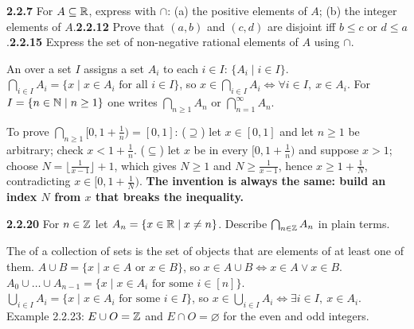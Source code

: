 \begin{trybox}[{2.2.7, 2.2.12, 2.2.15 \fO}]
\textbf{2.2.7} For $A\subseteq\mathbb{R}$, express with $\cap$: (a) the positive elements of $A$; (b) the integer elements of $A$.\quad \textbf{2.2.12} Prove that $(a,b)$ and $(c,d)$ are disjoint iff $b\le c$ or $d\le a$.\quad \textbf{2.2.15} Express the set of non-negative rational elements of $A$ using $\cap$.
\end{trybox}

\begin{key}
An  over a set $I$ assigns a set $A_i$ to each $i\in I$: $\{A_i\mid i\in I\}$. $\displaystyle\bigcap_{i\in I}A_i=\{x\mid x\in A_i\text{ for all }i\in I\}$, so $x\in\bigcap_{i\in I}A_i\Leftrightarrow\forall i\in I,\ x\in A_i$. For $I=\{n\in\mathbb{N}\mid n\ge1\}$ one writes $\bigcap_{n\ge1}A_n$ or $\bigcap_{n=1}^\infty A_n$.
\end{key}
\begin{strategy}
To prove $\bigcap_{n\ge1}[0,1+\frac1n)=[0,1]$: ($\supseteq$) let $x\in[0,1]$ and let $n\ge1$ be arbitrary; check $x<1+\frac1n$. ($\subseteq$) let $x$ be in every $[0,1+\frac1n)$ and suppose $x>1$; choose $N=\lfloor\frac1{x-1}\rfloor+1$, which gives $N\ge1$ and $N\ge\frac1{x-1}$, hence $x\ge1+\frac1N$, contradicting $x\in[0,1+\frac1N)$. \textbf{The invention is always the same: build an index $N$ from $x$ that breaks the inequality.}
\end{strategy}

\begin{trybox}[{2.2.20 \fO}]
\textbf{2.2.20} For $n\in\mathbb{Z}$ let $A_n=\{x\in\mathbb{R}\mid x\ne n\}$. Describe $\bigcap_{n\in\mathbb{Z}}A_n$ in plain terms.
\end{trybox}

\begin{key}
The  of a collection of sets is the set of objects that are elements of at least one of them. $A\cup B=\{x\mid x\in A\text{ or }x\in B\}$, so $x\in A\cup B\Leftrightarrow x\in A\vee x\in B$. $A_0\cup\dots\cup A_{n-1}=\{x\mid x\in A_i\text{ for some }i\in[n]\}$. $\displaystyle\bigcup_{i\in I}A_i=\{x\mid x\in A_i\text{ for some }i\in I\}$, so $x\in\bigcup_{i\in I}A_i\Leftrightarrow\exists i\in I,\ x\in A_i$. Example 2.2.23: $E\cup O=\mathbb{Z}$ and $E\cap O=\varnothing$ for the even and odd integers.
\end{key}

